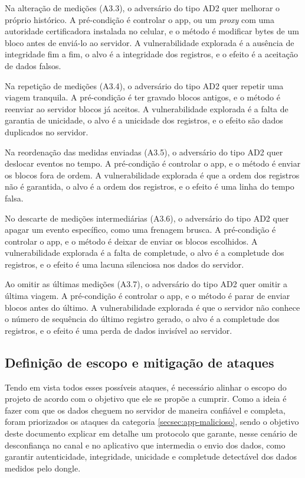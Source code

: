 \documentclass[
	12pt,
	article,			%
	oneside,
	a4paper,
	english,
	brazil				%
	]{abntex2}
\begin{document}
Na alteração de medições (A3.3), o adversário do tipo AD2 quer melhorar o próprio histórico. A pré-condição é controlar o app, ou um \textit{proxy}
com uma autoridade certificadora instalada no celular, e o método é modificar bytes de um bloco antes de enviá-lo ao servidor. A
vulnerabilidade explorada é a ausência de integridade fim a fim, o alvo é a integridade dos registros, e o efeito é a aceitação de dados falsos.

Na repetição de medições (A3.4), o adversário do tipo AD2 quer repetir uma viagem tranquila. A pré-condição é ter gravado blocos antigos, e o método
é reenviar ao servidor blocos já aceitos. A vulnerabilidade explorada é a falta de garantia de unicidade, o alvo é a unicidade dos registros,
e o efeito são dados duplicados no servidor.

Na reordenação das medidas enviadas (A3.5), o adversário do tipo AD2 quer deslocar eventos no tempo. A pré-condição é controlar o app, e o método é enviar os blocos
fora de ordem. A vulnerabilidade explorada é que a ordem dos registros não é garantida, o alvo é a ordem dos registros, e o efeito é uma
linha do tempo falsa.

No descarte de medições intermediárias (A3.6), o adversário do tipo AD2 quer apagar um evento específico, como uma frenagem brusca. A pré-condição
é controlar o app, e o método é deixar de enviar os blocos escolhidos. A vulnerabilidade explorada é a falta de completude, o alvo é a
completude dos registros, e o efeito é uma lacuna silenciosa nos dados do servidor.

Ao omitir as últimas medições (A3.7), o adversário do tipo AD2 quer omitir a última viagem. A pré-condição é controlar o app, e o método é parar de enviar
blocos antes do último. A vulnerabilidade explorada é que o servidor não conhece o número de sequência do último registro gerado, o alvo é a
completude dos registros, e o efeito é uma perda de dados invisível ao servidor.

\subsection{Definição de escopo e mitigação de ataques}


Tendo em vista todos esses possíveis ataques, é necessário alinhar o escopo do projeto de acordo com o objetivo que ele se propõe a cumprir.
Como a ideia é fazer com que os dados cheguem no servidor de maneira confiável e completa, foram priorizados os ataques da categoria \ref{secsec:app-malicioso},
sendo o objetivo deste documento explicar em detalhe um protocolo que garante, nesse cenário de desconfiança no canal e no aplicativo que intermedia o envio dos dados,
como garantir autenticidade, integridade, unicidade e completude detectável dos dados medidos pelo dongle.
\end{document}
